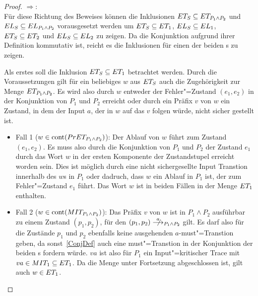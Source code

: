 \begin{proof}
  \glqq $\Rightarrow$\grqq{}:\\
  Für diese Richtung des Beweises können die Inklusionen $ET _S\subseteq ET
  _{P_1\land P_2}$ und $EL _S\subseteq EL _{P_1\land P_2}$ vorausgesetzt
  werden um $ET _S\subseteq ET _1$, $EL _S\subseteq EL _1$, $ET
  _S\subseteq ET _2$ und $EL _S\subseteq EL _2$ zu zeigen. Da die
  Konjunktion aufgrund ihrer Definition kommutativ ist, reicht es die
  Inklusionen für einen der beiden \MEIO{}s zu zeigen.

  Als erstes soll die Inklusion $ET _S\subseteq ET _1$ betrachtet werden.
  Durch die Voraussetzungen gilt für ein beliebiges $w$ aus $ET _S$ auch die
  Zugehörigkeit zur Menge $ET _{P_1\land P_2}$. Es wird also durch $w$
  entweder der Fehler"=Zustand $(e_1,e_2)$ in der Konjunktion von $P_1$ und
  $P_2$ erreicht oder durch ein Präfix $v$ von $w$ ein Zustand, in dem der
  Input $a$, der in $w$ auf das $v$ folgen würde, nicht sicher gestellt ist.
  \begin{itemize}
    \item Fall 1 ($w\in\mathrm{cont} (PrET _{P_1\land P_2})$): Der Ablauf von $w$
      führt zum Zustand $(e_1,e_2)$. Es muss also durch die Konjunktion von
      $P_1$ und $P_2$ der Zustand $e_1$ durch das Wort $w$ in der ersten
      Komponente der Zustandstupel erreicht worden sein. Dies ist möglich durch
      eine nicht sichergesellte Input Transtion innerhalb des $w$s in $P_1$
      oder dadruch, dass $w$ ein Ablauf in $P_1$ ist, der zum Fehler"=Zustand
      $e_1$ führt. Das Wort $w$ ist in beiden Fällen in der Menge $ET _1$
      enthalten.
    \item Fall 2 ($w\in\mathrm{cont} (MIT _{P_1\land P_2})$): Das Präfix $v$ von $w$
      ist in $P_1\land P_2$ ausführbar zu einem Zustand $(p_1,p_2)$, für den
      $(p_1,p_2)\nmust[a]_{P_1\land P_2}$ gilt. Es darf also für die Zustände
      $p_1$ und $p_2$ ebenfalls keine ausgehenden $a$-must"=Transtion geben, da
      sonst~\ref{ConjDef} auch eine must"=Transtion in der Konjunktion der
      beiden \MEIO{}s fordern würde. $va$ ist also für $P_1$ ein
      Input"=kritischer Trace mit $va\in MIT _1\subseteq ET _1$. Da die Menge
      \ET{} unter Fortsetzung abgeschlossen ist, gilt auch $w\in ET _1$.
  \end{itemize}


\end{proof}
